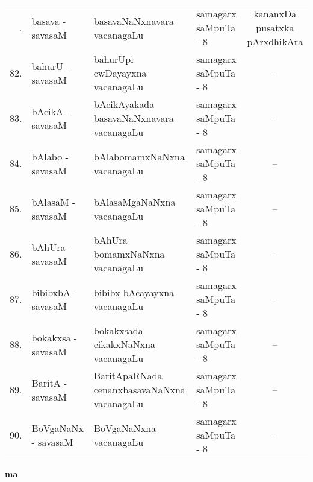 {\renewcommand{\arraystretch}{1.35}
\begin{longtable}{rl>{\raggedright}p{5.5cm}lc}
\endfirsthead
\endhead
\endfoot
\endlastfoot
81. & basava - savasaM & basavaNaNxnavara vacanagaLu & samagarx saMpuTa - 8 & kananxDa pusatxka pArxdhikAra\\
82. & bahurU - savasaM & bahurUpi cwDayayxna vacanagaLu & samagarx saMpuTa - 8 & --\\
83. & bAcikA - savasaM & bAcikAyakada basavaNaNxnavara vacanagaLu & samagarx saMpuTa - 8 & --\\
84. & bAlabo - savasaM & bAlabomamxNaNxna vacanagaLu & samagarx saMpuTa - 8 & --\\
85. & bAlasaM - savasaM & bAlasaMgaNaNxna vacanagaLu & samagarx saMpuTa - 8 & --\\
86. & bAhUra - savasaM & bAhUra bomamxNaNxna vacanagaLu & samagarx saMpuTa - 8 & --\\
87. & bibibxbA - savasaM & bibibx bAcayayxna vacanagaLu & samagarx saMpuTa - 8 & --\\
88. & bokakxsa - savasaM & bokakxsada cikakxNaNxna vacanagaLu & samagarx saMpuTa - 8 & --\\
89. & BaritA - savasaM & BaritApaRNada cenanxbasavaNaNxna vacanagaLu & samagarx saMpuTa - 8 & --\\
90. & BoVgaNaNx - savasaM & BoVgaNaNxna vacanagaLu & samagarx saMpuTa - 8 & --\\
\end{longtable}}
\smallskip

\centerline{\bf ma}

